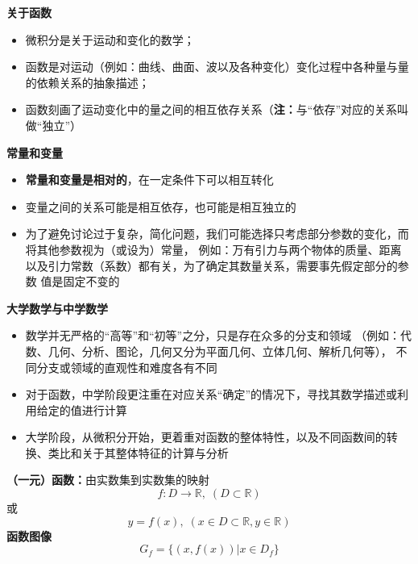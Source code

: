 	\begin{shaded}
		{\bf 关于函数}
		\begin{itemize}
		  \item 微积分是关于运动和变化的数学；
		  \item 函数是对运动（例如：曲线、曲面、波以及各种变化）变化过程中各种量与量的依赖关系的抽象描述；
		  \item 函数刻画了运动变化中的量之间的相互依存关系（{\bf 注：}与“依存”对应的关系叫做“独立”）
		\end{itemize}
		
		{\bf 常量和变量}
		\begin{itemize}
		  \item {\bf 常量和变量是相对的}，在一定条件下可以相互转化
		  \item 变量之间的关系可能是相互依存，也可能是相互独立的
		  \item 为了避免讨论过于复杂，简化问题，我们可能选择只考虑部分参数的变化，而将其他参数视为（或设为）常量，
		  例如：万有引力与两个物体的质量、距离以及引力常数（系数）都有关，为了确定其数量关系，需要事先假定部分的参数
		  值是固定不变的
		\end{itemize}
		
		{\bf 大学数学与中学数学}
		\begin{itemize}
		  \item 数学并无严格的“高等”和“初等”之分，只是存在众多的分支和领域
		  （例如：代数、几何、分析、图论，几何又分为平面几何、立体几何、解析几何等），
		  不同分支或领域的直观性和难度各有不同
		  \item 对于函数，中学阶段更注重在对应关系“确定”的情况下，寻找其数学描述或利用给定的值进行计算
		  \item 大学阶段，从微积分开始，更着重对函数的整体特性，以及不同函数间的转换、类比和关于其整体特征的计算与分析
		\end{itemize}
	\end{shaded}

	{\bf （一元）函数：}由实数集到实数集的映射
	$$f:D\to\mathbb{R},\;(D\subset\mathbb{R})$$
	或
	$$y=f(x),\;(x\in D\subset\mathbb{R},y\in\mathbb{R})$$
	{\bf 函数图像}
	$$G_f=\{(x,f(x))|x\in D_f\}$$
	
